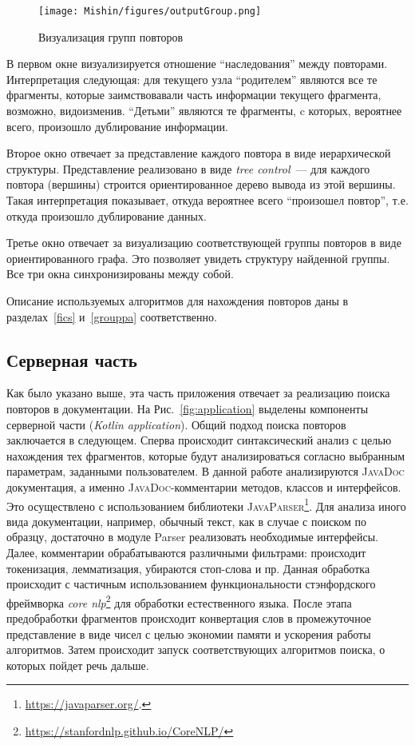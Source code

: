 \begin{figure}[h!]
    \centering
    \texttt{[image: Mishin/figures/outputGroup.png]}
    \caption{Визуализация групп повторов}\label{fig:groupViz}
\end{figure}

В первом окне визуализируется отношение ``наследования'' между повторами.
Интерпретация следующая: для текущего узла ``родителем'' являются все те фрагменты, которые заимствовавали часть информации текущего фрагмента, возможно, видоизменив.
``Детьми'' являются те фрагменты, c которых, вероятнее всего, произошло дублирование информации.

Второе окно отвечает за представление каждого повтора в виде иерархической структуры.
Представление реализовано в виде \emph{tree control}~--- для каждого повтора (вершины) строится ориентированное дерево вывода из этой вершины.
Такая интерпретация показывает, откуда вероятнее всего ``произошел повтор'', т.е. откуда произошло дублирование данных.

Третье окно отвечает за визуализацию соответствующей группы повторов в виде ориентированного графа.
Это позволяет увидеть структуру найденной группы.
Все три окна синхронизированы между собой.

Описание используемых алгоритмов для нахождения повторов даны в разделах~\ref{fics} и~\ref{grouppa} соответственно.


\subsection{Серверная часть}\label{server}
Как было указано выше, эта часть приложения отвечает за реализацию поиска повторов в документации.
На Рис.~\ref{fig:application} выделены компоненты серверной части (\emph{Kotlin application}).
Общий подход поиска повторов заключается в следующем.
Сперва происходит синтаксический анализ с целью нахождения тех фрагментов, которые будут анализироваться согласно выбранным параметрам, заданными пользователем.
В данной работе анализируются \textsc{JavaDoc} документация, а именно \textsc{JavaDoc}-комментарии методов, классов и интерфейсов.
Это осуществлено с использованием библиотеки \textsc{JavaParser}\footnote{\url{https://javaparser.org/}.}.
Для анализа иного вида документации, например, обычный текст, как в случае с поиском по образцу, достаточно в модуле Parser реализовать необходимые интерфейсы.
Далее, комментарии обрабатываются различными фильтрами: происходит токенизация, лемматизация, убираются стоп-слова и пр.
Данная обработка происходит с частичным использованием функциональности стэнфордского фреймворка \emph{core nlp}\footnote{\url{https://stanfordnlp.github.io/CoreNLP/}} для обработки естественного языка.
После этапа предобработки фрагментов происходит конвертация слов в промежуточное представление в виде чисел с целью экономии памяти и ускорения работы алгоритмов.
Затем происходит запуск соответствующих алгоритмов поиска, о которых пойдет речь дальше.



